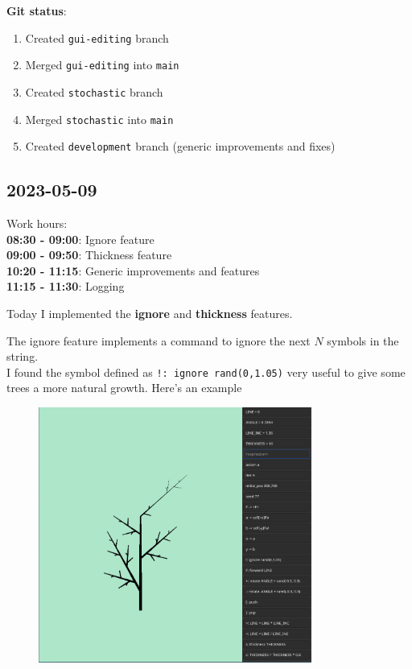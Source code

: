 \documentclass{article}
\begin{document}
\textbf{Git status}:
\begin{enumerate}
    \item Created \texttt{gui-editing} branch
    \item Merged \texttt{gui-editing} into \texttt{main}
    \item Created \texttt{stochastic} branch
    \item Merged \texttt{stochastic} into \texttt{main}
    \item Created \texttt{development} branch (generic improvements and fixes)
\end{enumerate}

\pagebreak

\subsection{2023-05-09}

Work hours:\\
\textbf{08:30 - 09:00}: Ignore feature \\
\textbf{09:00 - 09:50}: Thickness feature \\
\textbf{10:20 - 11:15}: Generic improvements and features \\
\textbf{11:15 - 11:30}: Logging

Today I implemented the \textbf{ignore} and \textbf{thickness} features.

The ignore feature implements a command to ignore the next \(N\) symbols
in the string. \\
I found the symbol defined as \texttt{!: ignore rand(0,1.05)} very useful
to give some trees a more natural growth.
Here's an example

\begin{center}
    \begin{figure}[h]
        \includegraphics[width=0.8\textwidth]{fractal_ignore.png}
    \end{figure}
\end{center}
\end{document}
